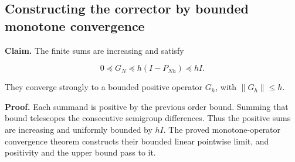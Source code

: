 \documentclass[11pt,a4paper]{report}
\begin{document}
\subsection{\texorpdfstring{Constructing the corrector by bounded monotone convergence}{Constructing the corrector by bounded monotone convergence}}
\label{report-step-WassersteinMixing-SemigroupPoisson-lean-3}


\textbf{Claim.} The finite sums are increasing and satisfy

\[0\preceq G_N\preceq h(I-P_{Nh})\preceq hI.\]

They converge strongly to a bounded positive operator \(G_h\), with \(\|G_h\|\le h\).



\textbf{Proof.} Each summand is positive by the previous order bound. Summing that bound telescopes the consecutive semigroup differences. Thus the positive sums are increasing and uniformly bounded by \(hI\). The proved monotone-operator convergence theorem constructs their bounded linear pointwise limit, and positivity and the upper bound pass to it.
\end{document}
